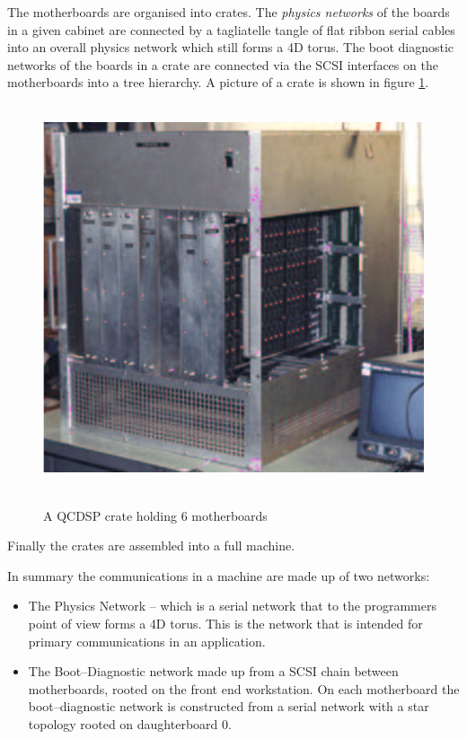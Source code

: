 The motherboards are organised into crates. The {\em physics networks}
of the boards in a given cabinet are connected by a tagliatelle tangle
of flat ribbon serial cables into an overall physics network which
still forms a 4D torus.  The boot diagnostic networks of the boards in
a crate are connected via the SCSI interfaces on the motherboards into
a tree hierarchy. A picture of a crate is shown in figure \ref{f:crate}.
\begin{figure}[ht]
\begin{center}
\leavevmode
\hbox{%
\includegraphics{crate_photo}
}
\end{center}
\caption{A QCDSP crate holding 6 motherboards}
\label{f:crate}
\end{figure}

Finally the crates are assembled into a full machine.

In summary the communications in a machine are made up of two networks:
\begin{itemize}
\item
The Physics Network -- which is a serial network that to the programmers
point of view forms a 4D torus. This is the network that is intended for 
primary communications in an application.
\item
The Boot--Diagnostic network made up from a SCSI chain between motherboards,
rooted on the front end workstation. On each motherboard the boot--diagnostic
network is constructed from a serial network with a star topology rooted
on daughterboard 0.
\end{itemize}

